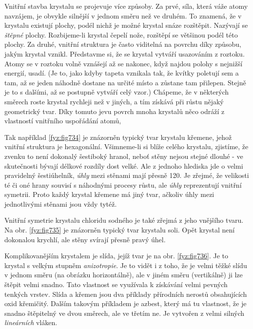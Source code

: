     Vnitřní stavba krystalu se projevuje více způsoby. Za prvé, síla, která váže atomy navzájem, je 
    obvykle silnější v jednom směru než ve druhém. To znamená, že v krystalu existují plochy, podél 
    nichž je možné krystal snáze rozštěpit. Nazývají se \emph{štěpné} plochy. Rozbijeme-li krystal 
    čepelí nože, rozštěpí se většinou podél této plochy. Za druhé, vnitřní struktura je často 
    viditelná na povrchu díky způsobu, jakým krystal vznikl. Představme si, že se krystal vytváří 
    usazováním z roztoku. Atomy se v roztoku volně vznášejí až se nakonec, když najdou polohy s 
    nejnižší energií, usadí. (Je to, jako kdyby tapeta vznikala tak, že kvítky poletují sem a tam, 
    až se jeden náhodně dostane na určité místo a zůstane tam přilepen. Stejně je to s dalšími, až 
    se postupně vytváří celý vzor.) Chápeme, že v některých směrech roste krystal rychleji než v 
    jiných, a tím získává při růstu nějaký geometrický tvar. Díky tomuto jevu povrch mnoha krystalů 
    něco odráží z vlastností vnitřního uspořádání atomů,
    
    Tak například \ref{fyz:fig734} je znázorněn typický tvar krystalu křemene, jehož vnitřní 
    struktura je hexagonální. Všimneme-li si blíže celého krystalu, zjistíme, že zvenku to není 
    dokonalý šestiboký hranol, neboť stěny nejsou stejné dlouhé - ve skutečnosti bývají délkové 
    rozdíly dost velké. Ale z jednoho hlediska jde o velmi pravidelný šestiúhelník, \emph{úhly} 
    mezi stěnami mají přesně \SI{120}{\deg}. Je zřejmé, že velikosti té či oné hrany souvisí s 
    náhodnými procesy růstu, ale \emph{úhly} reprezentují vnitřní symetrii. Proto každý krystal 
    křemene má jiný tvar, ačkoliv úhly mezi jednotlivými stěnami jsou vždy tytéž. 
    
    Vnitřní symetrie krystalu chloridu sodného je také zřejmá z jeho vnějšího tvaru. Na obr. 
    \ref{fyz:fig735} je znázorněn typický tvar krystalu soli. Opět krystal není dokonalou krychlí, 
    ale stěny svírají přesně pravý úhel. 
    
    Komplikovanějším krystalem je slída, jejíž tvar je na obr. \ref{fyz:fig736}. Je to krystal s 
    velkým stupněm \emph{anizotropie}. Je to vidět i z toho, že je velmi těžké slídu v jednom směru 
    (na obrázku horizontálně), ale v jiném směru (vertikálně) ji lze štěpit velmi snadno. Tato 
    vlastnost se využívala k získávání velmi pevných tenkých vrstev. Slída a křemen jsou dva 
    příklady přírodních nerostů obsahujících oxid křemičitý. Dalším takovým příkladem je azbest, 
    který má tu vlastnost, že je snadno štěpitelný ve dvou směrech, ale ve třetím ne. Je vytvořen z 
    velmi silných \emph{lineárních} vláken. 
    

